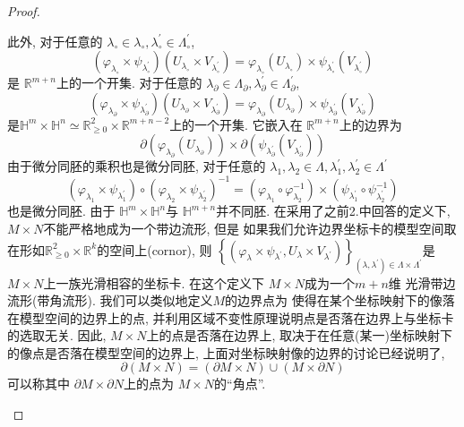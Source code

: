 \documentclass[../main.tex]{subfiles}
\begin{document}
\begin{proof}
\begin{enumerate}
\[    \]此外,  对于任意的 \(   \lambda_{\circ} \in  \lambda_{\circ} ,  \lambda _{\circ}^{\prime} \in  \Lambda _{\circ}^{\prime}   \), \[
    \left(  \varphi _{ \lambda_{\circ} }\times \psi _{ \lambda_{\circ} ^{\prime} } \right)\left( U_{ \lambda_{\circ} }\times V_{ \lambda_{\circ} ^{\prime} } \right)=  \varphi _{ \lambda_{\circ} }\left( U_{ \lambda_{\circ} } \right)\times \psi _{ \lambda_{\circ} ^{\prime} }\left( V_{ \lambda_{\circ} ^{\prime} } \right)    
    \] 是 \(  \mathbb{R} ^{m+ n}  \)上的一个开集. 对于任意的 \(   \lambda _{ \partial }\in  \Lambda _{ \partial },  \lambda _{ \partial }^{\prime} \in  \Lambda _{ \partial }^{\prime}   \), \[
    \left(  \varphi _{ \lambda _{ \partial }}\times \psi _{ \lambda _{ \partial }^{\prime} } \right)\left( U_{ \lambda _{ \partial }}\times V_{ \lambda _{ \partial }^{\prime} } \right)  =  \varphi _{ \lambda _{ \partial }}\left( U_{ \lambda _{ \partial }} \right)\times \psi _{ \lambda _{ \partial }^{\prime} }\left( V_{ \lambda _{ \partial }^{\prime} } \right)  
    \]是\(  \mathbb{H}^{m}\times \mathbb{H}^{n}\simeq \mathbb{R} ^{2}_{\ge 0} \times \mathbb{R} ^{m+ n-2}  \)上的一个开集. 它嵌入在 \(  \mathbb{R} ^{m+ n}  \)上的边界为 \[
     \partial \left(  \varphi _{ \lambda _{ \partial }}\left( U_{ \lambda _{ \partial }} \right)  \right)\times  \partial \left( \psi _{ \lambda _{ \partial }^{\prime} }\left( V_{ \lambda _{ \partial }^{\prime} } \right)   \right) 
    \]    由于微分同胚的乘积也是微分同胚, 对于任意的 \(   \lambda _1 , \lambda _2 \in  \Lambda ,  \lambda _1 ^{\prime} , \lambda _{2}^{\prime} \in  \Lambda ^{\prime}   \)    \[
    \left(  \varphi _{ \lambda _1 }\times \psi _{ \lambda_1 ^{\prime} } \right)\circ \left(  \varphi _{ \lambda _2 }\times \psi _{ \lambda _2 ^{\prime}}  \right)^{-1} = \left(  \varphi _{ \lambda _1 }\circ  \varphi _{ \lambda _2 }^{-1}  \right)\times \left( \psi _{ \lambda _1^{\prime}  }\circ \psi _{ \lambda _2 ^{\prime} }^{-1}  \right)   
    \]也是微分同胚. 由于 \(  \mathbb{H}^{m}\times \mathbb{H}^{n}  \)与 \(  \mathbb{H}^{m+ n}  \)并不同胚.     在采用了之前2.中回答的定义下,  \(  M\times N  \)不能严格地成为一个带边流形, 但是  如果我们允许边界坐标卡的模型空间取在形如$\mathbb{R}_{\ge 0}^2 \times \mathbb{R}^{k}$的空间上(cornor), 则 \(  \left\{ \left(  \varphi _{ \lambda }\times \psi _{ \lambda ^{\prime} } , U_{ \lambda }\times V_{ \lambda ^{\prime} }\right)  \right\}_{\left(  \lambda , \lambda ^{\prime}  \right)\in  \Lambda \times  \Lambda ^{\prime}     }  \)是 \(  M\times N  \)上一族光滑相容的坐标卡. 在这个定义下 \(  M\times N  \)成为一个\(  m+ n  \)维 光滑带边流形(带角流形). 我们可以类似地定义\(  M  \)的边界点为 使得在某个坐标映射下的像落在模型空间的边界上的点, 并利用区域不变性原理说明点是否落在边界上与坐标卡的选取无关. 因此,  \(  M\times N  \)上的点是否落在边界上, 取决于在任意(某一)坐标映射下的像点是否落在模型空间的边界上, 上面对坐标映射像的边界的讨论已经说明了,  \[
     \partial \left( M\times N \right)= \left(  \partial M\times N \right)\cup \left( M\times  \partial N \right)   
    \]可以称其中 \(   \partial M\times  \partial N  \)上的点为 \(  M\times N  \)的``角点''. 
   \end{enumerate}
    
\end{proof}
\end{document}
